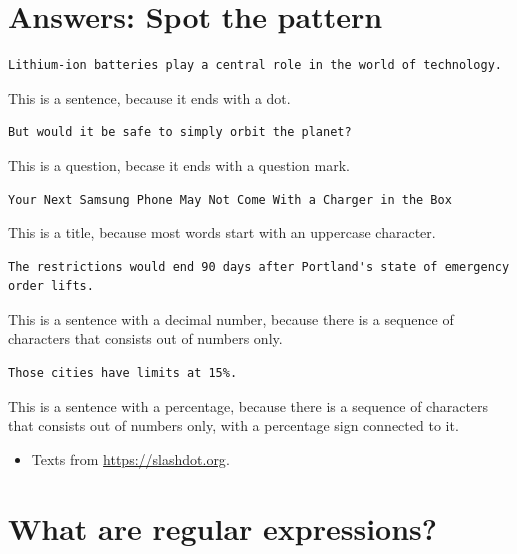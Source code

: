 \documentclass[]{book}
\providecommand{\tightlist}{%
  \setlength{\itemsep}{0pt}\setlength{\parskip}{0pt}}
\begin{document}
\hypertarget{answers-spot-the-pattern}{%
\section{Answers: Spot the pattern}\label{answers-spot-the-pattern}}

\begin{verbatim}
Lithium-ion batteries play a central role in the world of technology.
\end{verbatim}

This is a sentence, because it ends with a dot.

\begin{verbatim}
But would it be safe to simply orbit the planet?
\end{verbatim}

This is a question, becase it ends with a question mark.

\begin{verbatim}
Your Next Samsung Phone May Not Come With a Charger in the Box
\end{verbatim}

This is a title, because most words start with an uppercase character.

\begin{verbatim}
The restrictions would end 90 days after Portland's state of emergency order lifts. 
\end{verbatim}

This is a sentence with a decimal number, because there is a sequence of
characters that consists out of numbers only.

\begin{verbatim}
Those cities have limits at 15%.
\end{verbatim}

This is a sentence with a percentage, because there is a sequence of
characters that consists out of numbers only, with a percentage sign connected
to it.

\begin{itemize}
\tightlist
\item
  Texts from \url{https://slashdot.org}.
\end{itemize}

\hypertarget{what-are-regular-expressions}{%
\section{What are regular expressions?}\label{what-are-regular-expressions}}
\end{document}
